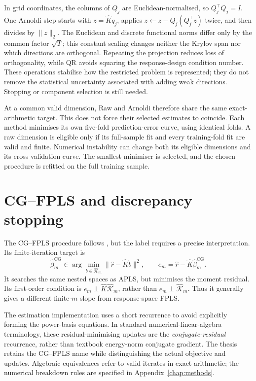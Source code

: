 In grid coordinates, the columns of $Q_j$ are Euclidean-normalised, so
$Q_j^\top Q_j=I$. One Arnoldi step starts with $z=\widehat Kq_j$,
applies $z\leftarrow z-Q_j(Q_j^\top z)$ twice, and then divides by
$\|z\|_2$. The Euclidean and discrete functional norms differ only by
the common factor $\sqrt T$; this constant scaling changes neither the
Krylov span nor which directions are orthogonal. Repeating the
projection reduces loss of orthogonality, while QR avoids squaring the
response-design condition number. These operations stabilise how the
restricted problem is represented; they do not remove the statistical
uncertainty associated with adding weak directions. Stopping or component
selection is still needed.

At a common valid dimension, Raw and Arnoldi therefore share the same
exact-arithmetic target. This does not force their selected estimates to
coincide. Each method minimises its own five-fold prediction-error curve,
using identical folds. A raw dimension is eligible only if its full-sample
fit and every training-fold fit are valid and finite. Numerical instability
can change both its eligible dimensions and its cross-validation curve.
The smallest minimiser is selected, and the chosen procedure is refitted
on the full training sample.

\section{CG--FPLS and discrepancy stopping}

The CG--FPLS procedure follows \textcite{babii_carrasco_tsafack_2026}, but
the label requires a precise interpretation. Its finite-iteration target is
\begin{equation}
 \widehat\beta_m^{\mathrm{CG}}
 \in\arg\min_{b\in\widehat{\mathcal K}_m}
       \|\widehat r-\widehat Kb\|^2,
 \qquad e_m=\widehat r-\widehat K\widehat\beta_m^{\mathrm{CG}}.
 \label{main:eq:cg}
\end{equation}
It searches the same nested spaces as APLS, but minimises the moment
residual. Its first-order condition is
$e_m\perp\widehat K\widehat{\mathcal K}_m$, rather than
$e_m\perp\widehat{\mathcal K}_m$. Thus it generally gives a different
finite-$m$ slope from response-space FPLS.

The estimation implementation uses a short recurrence to avoid explicitly
forming the power-basis equations. In standard numerical-linear-algebra
terminology, these residual-minimising updates are the
\emph{conjugate-residual} recurrence, rather than textbook energy-norm
conjugate gradient. The thesis retains the CG--FPLS name while distinguishing
the actual objective and updates. Algebraic equivalences refer to valid
iterates in exact arithmetic; the numerical breakdown rules are specified
in Appendix~\ref{chap:methods}.

